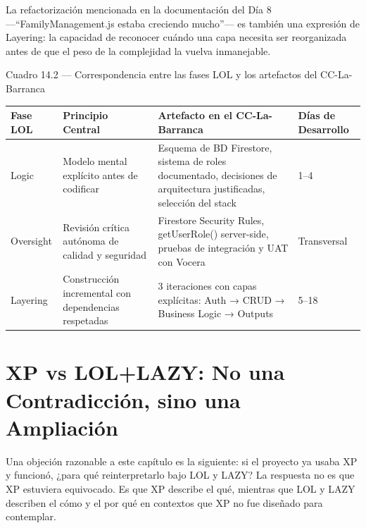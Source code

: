 \documentclass[14pt,a4paper,oneside]{extbook}
\begin{document}
La refactorización mencionada en la documentación del Día 8 ---\enquote{FamilyManagement.js estaba creciendo mucho}--- es también una expresión de Layering: la capacidad de reconocer cuándo una capa necesita ser reorganizada antes de que el peso de la complejidad la vuelva inmanejable.



Cuadro 14.2 --- Correspondencia entre las fases LOL y los artefactos del CC-La-Barranca

\begin{table}[htbp]
\centering
\begin{tabular}{p{} p{} p{} p{}}
\toprule
\textbf{Fase LOL} & \textbf{Principio Central} & \textbf{Artefacto en el CC-La-Barranca} & \textbf{Días de Desarrollo} \\
\midrule
Logic & Modelo mental explícito antes de codificar & Esquema de BD Firestore, sistema de roles documentado, decisiones de arquitectura justificadas, selección del stack & 1–4 \\
Oversight & Revisión crítica autónoma de calidad y seguridad & Firestore Security Rules, getUserRole() server-side, pruebas de integración y UAT con Vocera & Transversal \\
Layering & Construcción incremental con dependencias respetadas & 3 iteraciones con capas explícitas: Auth → CRUD → Business Logic → Outputs & 5–18 \\
\bottomrule
\end{tabular}
\end{table}





\section{XP vs LOL+LAZY: No una Contradicción, sino una Ampliación}

Una objeción razonable a este capítulo es la siguiente: si el proyecto ya usaba XP y funcionó, ¿para qué reinterpretarlo bajo LOL y LAZY? La respuesta no es que XP estuviera equivocado. Es que XP describe el qué, mientras que LOL y LAZY describen el cómo y el por qué en contextos que XP no fue diseñado para contemplar.
\end{document}

